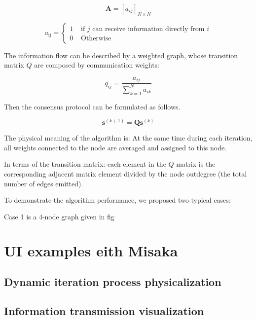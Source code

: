 \documentclass[conference]{IEEEtran}
\begin{document}
\begin{equation}
    \mathbf{A}=\left[a_{i j}\right]_{N \times N}
\end{equation}

\begin{equation}
    a_{\mathrm{ij}}=\left\{\begin{array}{ll}
    {1} & {\text { if } j \text{ can receive information directly from } i } \\
    {0} & {\text { Otherwise }}
    \end{array}\right.
\end{equation}

The information flow can be described by a weighted graph, whose transition matrix $Q$ are composed by communication weights:

\begin{equation}
    q_{i j}=\frac{a_{i j}}{\sum_{k=1}^{N} a_{i k}}
\end{equation}

Then the consensus protocol can be formulated as follows.

\begin{equation}\boldsymbol{s}^{(k+1)}=\boldsymbol{Q} \boldsymbol{s}^{(k)}\end{equation}

The physical meaning of the algorithm is: At the same time during each iteration, all weights connected to the node are averaged and assigned to this node.

In terms of the transition matrix: each element in the $Q$ matrix is the corresponding adjacent matrix element divided by the node outdegree (the total number of edges emitted).

To demonstrate the algorithm performance, we proposed two typical cases:

Case 1 is a 4-node graph given in fig

\section{UI examples eith Misaka}

\subsection{Dynamic iteration process physicalization}

\subsection{Information transmission visualization}
\end{document}
